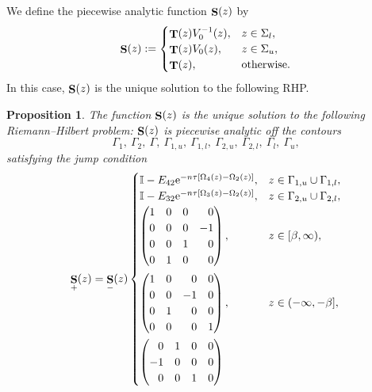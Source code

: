 \documentclass[10pt,a4paper]{amsart}
\DeclareMathOperator{\TT}{{\bf T}}
\DeclareMathOperator{\boldS}{{\bf S}}
\numberwithin{equation}{section}
\newtheorem{Proposition}[Theorem]{Proposition}
 { \theoremstyle{definition}
\newtheorem{Definition}[Theorem]{Definition}
\newtheorem{Note}[Theorem]{Note}
\newtheorem{Example}[Theorem]{Example}
\newtheorem{Remark}[Theorem]{Remark} }
\begin{document}
We define the piecewise analytic function $\boldS(z)$ by
 \begin{equation*}
 \boldS(z) :=
 \begin{cases}
 \TT(z)V_0^{-1}(z), & z\in\Sigma_{l},\\
 \TT(z)V_0(z), & z\in\Sigma_{u},\\
 \TT(z), & \text{otherwise}.
 \end{cases}
 \end{equation*}
In this case, $\boldS(z)$ is the unique solution to the following RHP.

 \begin{Proposition} %
 The function $\boldS(z)$ is the unique solution to the following Riemann--Hilbert problem:
 $\boldS(z)$ is piecewise analytic off the contours
 \[
 \Gamma_1 , \ \Gamma_2, \ \Gamma, \ \Gamma_{1,u}, \ \Gamma_{1,l}, \ \Gamma_{2,u}, \ \Gamma_{2,l}, \ \Gamma_l, \ \Gamma_u,
 \]
 satisfying the jump condition
 \begin{equation*} %
 \boldS_{+}(z) = \boldS_{-}(z)
 \begin{cases}
 \mathbb{I} - E_{42}{\rm e}^{-n\tau[\Omega_4(z) - \Omega_2(z)]}, & z\in \Gamma_{1,u} \cup \Gamma_{1,l},\\
 \mathbb{I} - E_{32}{\rm e}^{-n\tau[\Omega_3(z) - \Omega_2(z)]}, & z\in \Gamma_{2,u} \cup \Gamma_{2,l},\\
 \begin{pmatrix}
 1 & 0 & 0 & \hphantom{-}0\\
 0 & 0 & 0 & -1\\
 0 & 0 & 1 & \hphantom{-}0\\
 0 & 1 & 0 & \hphantom{-}0
 \end{pmatrix}, & z\in [\beta,\infty),\vspace{1mm}\\
 \begin{pmatrix}
 1 & 0 & \hphantom{-}0 & 0\\
 0 & 0 & -1 & 0\\
 0 & 1 & \hphantom{-}0 & 0\\
 0 & 0 & \hphantom{-}0 & 1
 \end{pmatrix}, & z\in (-\infty,-\beta],\vspace{1mm}\\
 \begin{pmatrix}
 \hphantom{-}0 & 1 & 0 & 0\\
 -1 & 0 & 0 & 0\\
 \hphantom{-}0 & 0 & 1 & 0 \\

\end{pmatrix}
\end{cases}
\end{equation*}
\end{Proposition}
\end{document}
